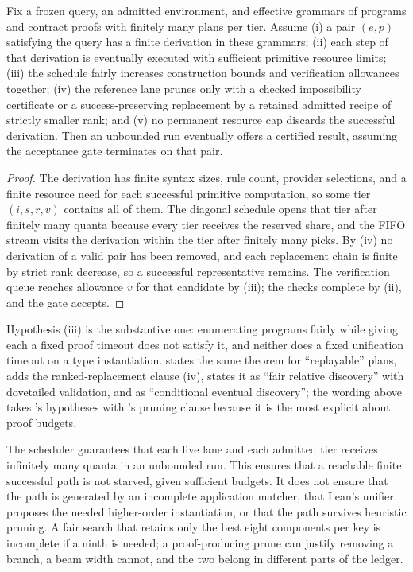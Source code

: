 \begin{theorem}\label{thm:dovetail}
Fix a frozen query, an admitted environment, and effective grammars of programs and contract proofs with finitely many plans per tier. Assume (i) a pair $(e,p)$ satisfying the query has a finite derivation in these grammars; (ii) each step of that derivation is eventually executed with sufficient primitive resource limits; (iii) the schedule fairly increases construction bounds and verification allowances together; (iv) the reference lane prunes only with a checked impossibility certificate or a success-preserving replacement by a retained admitted recipe of strictly smaller rank; and (v) no permanent resource cap discards the successful derivation. Then an unbounded run eventually offers a certified result, assuming the acceptance gate terminates on that pair.
\end{theorem}
\begin{proof}
The derivation has finite syntax sizes, rule count, provider selections, and a finite resource need for each successful primitive computation, so some tier $(i,s,r,v)$ contains all of them. The diagonal schedule opens that tier after finitely many quanta because every tier receives the reserved share, and the FIFO stream visits the derivation within the tier after finitely many picks. By (iv) no derivation of a valid pair has been removed, and each replacement chain is finite by strict rank decrease, so a successful representative remains. The verification queue reaches allowance $v$ for that candidate by (iii); the checks complete by (ii), and the gate accepts.
\end{proof}
Hypothesis (iii) is the substantive one: enumerating programs fairly while giving each a fixed proof timeout does not satisfy it, and neither does a fixed unification timeout on a type instantiation.  states the same theorem for ``replayable'' plans,  adds the ranked-replacement clause (iv),  states it as ``fair relative discovery'' with dovetailed validation, and  as ``conditional eventual discovery''; the wording above takes 's hypotheses with 's pruning clause because it is the most explicit about proof budgets.

\begin{remark}
The scheduler guarantees that each live lane and each admitted tier receives infinitely many quanta in an unbounded run. This ensures that a reachable finite successful path is not starved, given sufficient budgets. It does not ensure that the path is generated by an incomplete application matcher, that Lean's unifier proposes the needed higher-order instantiation, or that the path survives heuristic pruning. A fair search that retains only the best eight components per key is incomplete if a ninth is needed; a proof-producing prune can justify removing a branch, a beam width cannot, and the two belong in different parts of the ledger.
\end{remark}

